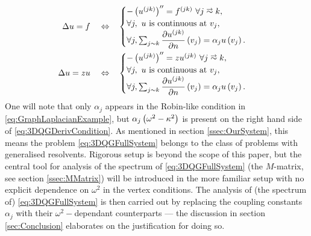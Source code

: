\begin{align*}
	\laplacian u = f \quad\Leftrightarrow\quad &
	\begin{cases}
		-\bracs{u^{(jk)}}'' = f^{(jk)} \ \forall j\conLeft k, \\
		\forall j, \ u \text{ is continuous at } v_j, \\
		\forall j, \sum_{j\con k}\pdiff{u^{(jk)}}{n}\bracs{v_j} = \alpha_j u\bracs{v_j}.
	\end{cases} \\
	\laplacian u = z u \quad\Leftrightarrow\quad &
	\begin{cases}
		-\bracs{u^{(jk)}}'' = z u^{(jk)} \ \forall j\conLeft k, \\
		\forall j, \ u \text{ is continuous at } v_j, \\
		\forall j, \sum_{j\con k}\pdiff{u^{(jk)}}{n}\bracs{v_j} = \alpha_j u\bracs{v_j}.
	\end{cases}
\end{align*}
One will note that only $\alpha_j$ appears in the Robin-like condition in \eqref{eq:GraphLaplacianExample}, but $\alpha_j\left( \omega^2-\kappa^2 \right)$ is present on the right hand side of \eqref{eq:3DQGDerivCondition}.
As mentioned in section \ref{ssec:OurSystem}, this means the problem \eqref{eq:3DQGFullSystem} belongs to the class of problems with generalised resolvents.
Rigorous setup is beyond the scope of this paper, but the central tool for analysis of the spectrum of \eqref{eq:3DQGFullSystem} (the $M$-matrix, see section \ref{ssec:MMatrix}) will be introduced in the more familiar setup with no explicit dependence on $\omega^2$ in the vertex conditions.
The analysis of (the spectrum of) \eqref{eq:3DQGFullSystem} is then carried out by replacing the coupling constants $\alpha_j$ with their $\omega^2-$dependant counterparts --- the discussion in section \ref{sec:Conclusion} elaborates on the justification for doing so.

